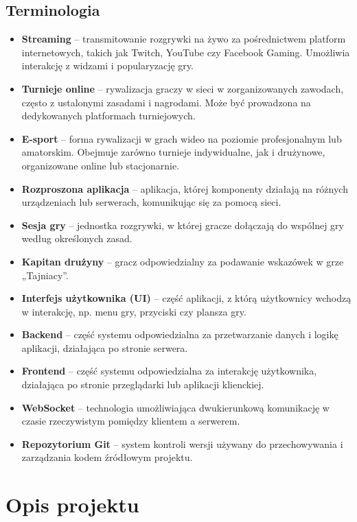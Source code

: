 \documentclass[12pt,a4paper]{book}
\begin{document}
\section{Terminologia}
\begin{itemize}
    \item \textbf{Streaming} – transmitowanie rozgrywki na żywo za pośrednictwem platform internetowych, takich jak Twitch, YouTube czy Facebook Gaming. Umożliwia interakcję z widzami i popularyzację gry.
    \item \textbf{Turnieje online} – rywalizacja graczy w sieci w zorganizowanych zawodach, często z ustalonymi zasadami i nagrodami. Może być prowadzona na dedykowanych platformach turniejowych.
    \item \textbf{E-sport} – forma rywalizacji w grach wideo na poziomie profesjonalnym lub amatorskim. Obejmuje zarówno turnieje indywidualne, jak i drużynowe, organizowane online lub stacjonarnie.
    \item \textbf{Rozproszona aplikacja} – aplikacja, której komponenty działają na różnych urządzeniach lub serwerach, komunikując się za pomocą sieci.
    \item \textbf{Sesja gry} – jednostka rozgrywki, w której gracze dołączają do wspólnej gry według określonych zasad.
    \item \textbf{Kapitan drużyny} – gracz odpowiedzialny za podawanie wskazówek w grze „Tajniacy”.
    \item \textbf{Interfejs użytkownika (UI)} – część aplikacji, z którą użytkownicy wchodzą w interakcję, np. menu gry, przyciski czy plansza gry.
    \item \textbf{Backend} – część systemu odpowiedzialna za przetwarzanie danych i logikę aplikacji, działająca po stronie serwera.
    \item \textbf{Frontend} – część systemu odpowiedzialna za interakcję użytkownika, działająca po stronie przeglądarki lub aplikacji klienckiej.
    \item \textbf{WebSocket} – technologia umożliwiająca dwukierunkową komunikację w czasie rzeczywistym pomiędzy klientem a serwerem.
    \item \textbf{Repozytorium Git} – system kontroli wersji używany do przechowywania i zarządzania kodem źródłowym projektu.
\end{itemize}


\chapter{Opis projektu}
\end{document}
